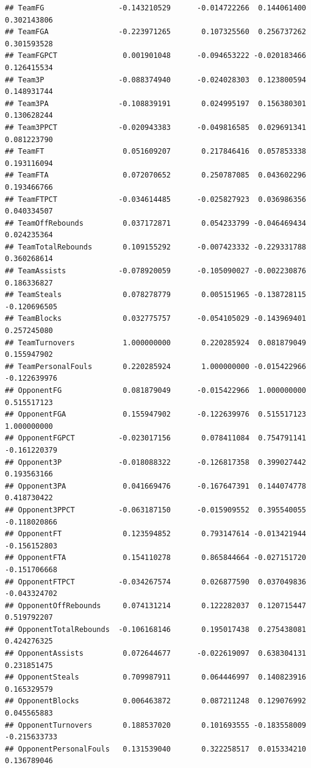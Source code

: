 \documentclass[
]{book}
\begin{document}
\begin{verbatim}
## TeamFG                 -0.143210529      -0.014722266  0.144061400  0.302143806
## TeamFGA                -0.223971265       0.107325560  0.256737262  0.301593528
## TeamFGPCT               0.001901048      -0.094653222 -0.020183466  0.126415534
## Team3P                 -0.088374940      -0.024028303  0.123800594  0.148931744
## Team3PA                -0.108839191       0.024995197  0.156380301  0.130628244
## Team3PPCT              -0.020943383      -0.049816585  0.029691341  0.081223790
## TeamFT                  0.051609207       0.217846416  0.057853338  0.193116094
## TeamFTA                 0.072070652       0.250787085  0.043602296  0.193466766
## TeamFTPCT              -0.034614485      -0.025827923  0.036986356  0.040334507
## TeamOffRebounds         0.037172871       0.054233799 -0.046469434  0.024235364
## TeamTotalRebounds       0.109155292      -0.007423332 -0.229331788  0.360268614
## TeamAssists            -0.078920059      -0.105090027 -0.002230876  0.186336827
## TeamSteals              0.078278779       0.005151965 -0.138728115 -0.120696505
## TeamBlocks              0.032775757      -0.054105029 -0.143969401  0.257245080
## TeamTurnovers           1.000000000       0.220285924  0.081879049  0.155947902
## TeamPersonalFouls       0.220285924       1.000000000 -0.015422966 -0.122639976
## OpponentFG              0.081879049      -0.015422966  1.000000000  0.515517123
## OpponentFGA             0.155947902      -0.122639976  0.515517123  1.000000000
## OpponentFGPCT          -0.023017156       0.078411084  0.754791141 -0.161220379
## Opponent3P             -0.018088322      -0.126817358  0.399027442  0.193563166
## Opponent3PA             0.041669476      -0.167647391  0.144074778  0.418730422
## Opponent3PPCT          -0.063187150      -0.015909552  0.395540055 -0.118020866
## OpponentFT              0.123594852       0.793147614 -0.013421944 -0.156152803
## OpponentFTA             0.154110278       0.865844664 -0.027151720 -0.151706668
## OpponentFTPCT          -0.034267574       0.026877590  0.037049836 -0.043324702
## OpponentOffRebounds     0.074131214       0.122282037  0.120715447  0.519792207
## OpponentTotalRebounds  -0.106168146       0.195017438  0.275438081  0.424276325
## OpponentAssists         0.072644677      -0.022619097  0.638304131  0.231851475
## OpponentSteals          0.709987911       0.064446997  0.140823916  0.165329579
## OpponentBlocks          0.006463872       0.087211248  0.129076992  0.045565883
## OpponentTurnovers       0.188537020       0.101693555 -0.183558009 -0.215633733
## OpponentPersonalFouls   0.131539040       0.322258517  0.015334210  0.136789046

\end{verbatim}
\end{document}
